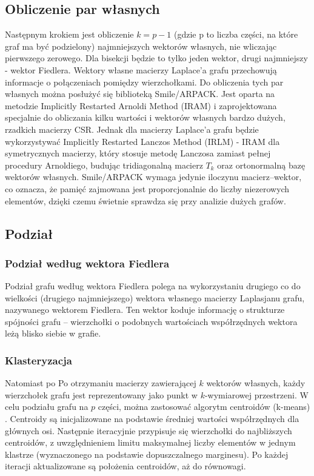 \documentclass{article}
\begin{document}
    \subsection{Obliczenie par własnych}

    Następnym krokiem jest obliczenie \(k = p - 1\) (gdzie p to liczba części, na które graf ma być podzielony) najmniejszych wektorów własnych, nie wliczając pierwszego zerowego. Dla bisekcji będzie to tylko jeden wektor, drugi najmniejszy - wektor Fiedlera. Wektory własne macierzy Laplace'a grafu przechowują informacje o połączeniach pomiędzy wierzchołkami. Do obliczenia tych par własnych można posłużyć się biblioteką Smile/ARPACK. Jest oparta na metodzie Implicitly Restarted Arnoldi Method (IRAM) i zaprojektowana specjalnie do obliczania kilku wartości i wektorów własnych bardzo dużych, rzadkich macierzy CSR. Jednak dla macierzy Laplace'a grafu będzie wykorzystywać Implicitly Restarted Lanczos Method (IRLM) - IRAM dla symetrycznych macierzy, który stosuje metodę Lanczosa zamiast pełnej procedury Arnoldiego, budując tridiagonalną macierz $T_k$ oraz ortonormalną bazę wektorów własnych. Smile/ARPACK wymaga jedynie iloczynu macierz–wektor, co oznacza, że pamięć zajmowana jest proporcjonalnie do liczby niezerowych elementów, dzięki czemu świetnie sprawdza się przy analizie dużych grafów.



    \subsection{Podział}

    \subsubsection{Podział według wektora Fiedlera}
    Podział grafu według wektora Fiedlera polega na wykorzystaniu drugiego co do wielkości (drugiego najmniejszego) wektora własnego macierzy Laplasjanu grafu, nazywanego wektorem Fiedlera. Ten wektor koduje informację o strukturze spójności grafu – wierzchołki o podobnych wartościach współrzędnych wektora leżą blisko siebie w grafie.

    \subsubsection{Klasteryzacja}
    Natomiast po Po otrzymaniu macierzy zawierającej \(k\) wektorów własnych, każdy wierzchołek grafu jest reprezentowany jako punkt w \(k\)-wymiarowej przestrzeni. W celu podziału grafu na \(p\) części, można zastosować algorytm centroidów (k-means) \cite{k-means}.
    Centroidy są inicjalizowane na podstawie średniej wartości współrzędnych dla głównych osi. Następnie iteracyjnie przypisuje się wierzchołki do najbliższych centroidów, z uwzględnieniem limitu maksymalnej liczby elementów w jednym klastrze (wyznaczonego na podstawie dopuszczalnego marginesu). Po każdej iteracji aktualizowane są położenia centroidów, aż do równowagi.
\end{document}
